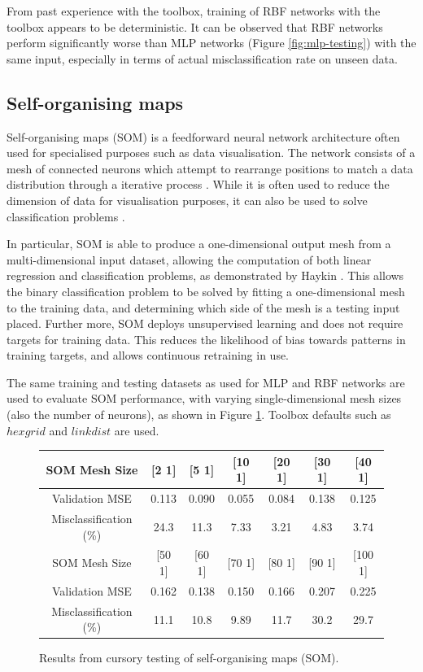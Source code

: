 \documentclass[10pt, oneside]{article}
\begin{document}
From past experience with the toolbox, training of RBF networks with the toolbox appears to be deterministic. It can be observed that RBF networks perform significantly worse than MLP networks (Figure \ref{fig:mlp-testing}) with the same input, especially in terms of actual misclassification rate on unseen data.

\subsection{Self-organising maps} \label{subsec:som-test}

Self-organising maps (SOM) is a feedforward neural network architecture often used for specialised purposes such as data visualisation. The network consists of a mesh of connected neurons which attempt to rearrange positions to match a data distribution through a iterative process \cite[p. 34]{som-lecture}. While it is often used to reduce the dimension of data for visualisation purposes, it can also be used to solve classification problems \cite{owens2000application}. 

In particular, SOM is able to produce a one-dimensional output mesh from a multi-dimensional input dataset, allowing the computation of both linear regression and classification problems, as demonstrated by Haykin \cite[Sec. 9.5]{haykin2008}. This allows the binary classification problem to be solved by fitting a one-dimensional mesh to the training data, and determining which side of the mesh is a testing input placed. Further more, SOM deploys unsupervised learning and does not require targets for training data. This reduces the likelihood of bias towards patterns in training targets, and allows continuous retraining in use.

The same training and testing datasets as used for MLP and RBF networks are used to evaluate SOM performance, with varying single-dimensional mesh sizes (also the number of neurons), as shown in Figure \ref{fig:som-testing}. Toolbox defaults such as $hexgrid$ and $linkdist$ are used.

\begin{figure}[h]
\begin{center}
\fontsize{9}{11}\selectfont
\begin{tabular}{|c|c|c|c|c|c|c|}
\hline 
SOM Mesh Size & [2 1] & [5 1] & [10 1] & [20 1] & [30 1] & [40 1] \\ \hline 
Validation MSE & 0.113 & 0.090 & 0.055 & 0.084 & 0.138 & 0.125 \\ \hline 
Misclassification (\%) & 24.3 & 11.3 & 7.33 & 3.21 & 4.83 & 3.74 \\ \hline \hline 
SOM Mesh Size & [50 1] & [60 1] & [70 1] & [80 1] & [90 1] & [100 1] \\ \hline 
Validation MSE & 0.162 & 0.138 & 0.150 & 0.166 & 0.207 & 0.225 \\ \hline 
Misclassification (\%) & 11.1 & 10.8 & 9.89 & 11.7 & 30.2 & 29.7 \\ \hline 
\end{tabular}
\end{center}
\caption{\label{fig:som-testing} Results from cursory testing of self-organising maps (SOM).}
\end{figure}
\end{document}
